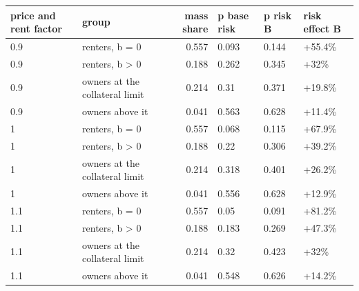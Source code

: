 \begingroup\small
\setlength{\tabcolsep}{3pt}
\renewcommand{\arraystretch}{1.04}
\begin{tabularx}{\linewidth}{XXrXXX}
\toprule
price and rent factor & group & mass share & p base risk & p risk B & risk effect B \\
\midrule
0.9 & renters, b = 0 & 0.557 & 0.093 & 0.144 & +55.4\% \\
0.9 & renters, b \textgreater{} 0 & 0.188 & 0.262 & 0.345 & +32\% \\
0.9 & owners at the collateral limit & 0.214 & 0.31 & 0.371 & +19.8\% \\
0.9 & owners above it & 0.041 & 0.563 & 0.628 & +11.4\% \\
1 & renters, b = 0 & 0.557 & 0.068 & 0.115 & +67.9\% \\
1 & renters, b \textgreater{} 0 & 0.188 & 0.22 & 0.306 & +39.2\% \\
1 & owners at the collateral limit & 0.214 & 0.318 & 0.401 & +26.2\% \\
1 & owners above it & 0.041 & 0.556 & 0.628 & +12.9\% \\
1.1 & renters, b = 0 & 0.557 & 0.05 & 0.091 & +81.2\% \\
1.1 & renters, b \textgreater{} 0 & 0.188 & 0.183 & 0.269 & +47.3\% \\
1.1 & owners at the collateral limit & 0.214 & 0.32 & 0.423 & +32\% \\
1.1 & owners above it & 0.041 & 0.548 & 0.626 & +14.2\% \\
\bottomrule
\end{tabularx}
\endgroup

